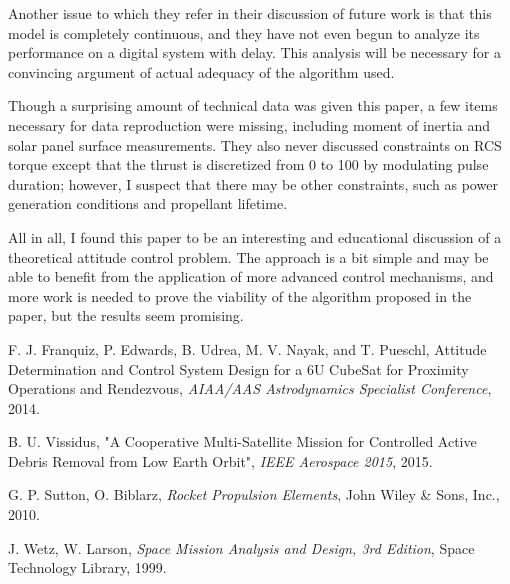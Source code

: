 \documentclass[letterpaper, 11 pt, conference]{ieeeconf}  %
\begin{document}
Another issue to which they refer in their discussion of future work is that this model is completely continuous, and they have not even begun to analyze its performance on a digital system with delay. This analysis will be necessary for a convincing argument of actual adequacy of the algorithm used.

Though a surprising amount of technical data was given this paper, a few items necessary for data reproduction were missing, including moment of inertia and solar panel surface measurements. They also never discussed constraints on RCS torque except that the thrust is discretized from 0 to 100 by modulating pulse duration; however, I suspect that there may be other constraints, such as power generation conditions and propellant lifetime. 

All in all, I found this paper to be an interesting and educational discussion of a theoretical attitude control problem. The approach is a bit simple and may be able to benefit from the application of more advanced control mechanisms, and more work is needed to prove the viability of the algorithm proposed in the paper, but the results seem promising.


\begin{thebibliography}{99}

F. J. Franquiz, P. Edwards, B. Udrea, M. V. Nayak, and T. Pueschl, Attitude Determination and Control System Design for a 6U CubeSat for Proximity Operations and Rendezvous, {\it AIAA/AAS Astrodynamics Specialist Conference}, 2014.

B. U. Vissidus, "A Cooperative Multi-Satellite Mission for Controlled Active Debris Removal from Low Earth Orbit", {\it IEEE Aerospace 2015}, 2015.

G. P. Sutton, O. Biblarz, {\it Rocket Propulsion Elements}, John Wiley \& Sons, Inc., 2010.

J. Wetz, W. Larson, {\it Space Mission Analysis and Design, 3rd Edition}, Space Technology Library, 1999.

\end{thebibliography}
\end{document}
